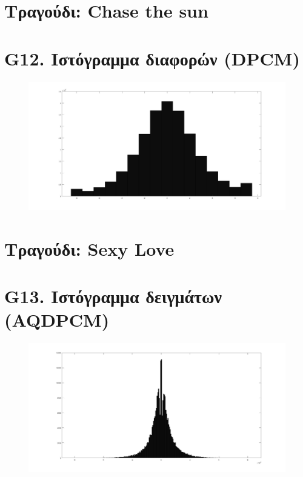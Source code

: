 \documentclass{article}
\begin{document}
\section*{Τραγούδι: Chase the sun}
\section*{G12. Ιστόγραμμα διαφορών (DPCM) }
\begin{figure}[h!]
 \begin{center}
 \advance\leftskip-6cm
  \includegraphics[width=230mm,scale=0.7]{g12s1.jpg}
\end{center}
\end{figure}
\newpage
\section*{Τραγούδι: Sexy Love}
\section*{G13. Ιστόγραμμα δειγμάτων (AQDPCM) }
\begin{figure}[h!]
 \begin{center}
 \advance\leftskip-6cm
  \includegraphics[width=230mm,scale=0.7]{g13s1.jpg}
\end{center}
\end{figure}
\newpage
\end{document}
